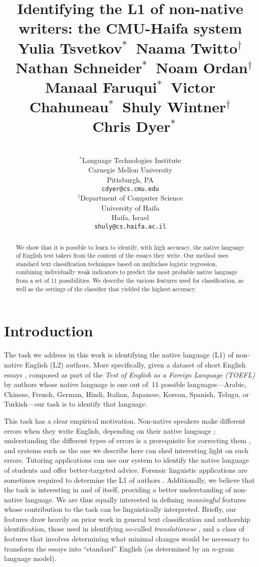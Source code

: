 \documentclass[11pt,letterpaper]{article}
\title{Identifying the L1 of non-native writers: the CMU-Haifa system\\[1em] 
{\large Yulia Tsvetkov$^\ast$\ Naama Twitto$^\dagger$\  Nathan Schneider$^\ast$\ Noam Ordan$^\dagger$\\ 
Manaal Faruqui$^\ast$\  Victor Chahuneau$^\ast$\  Shuly Wintner$^\dagger$ \  Chris Dyer$^\ast$}\\[-3em]
}
\author{
\\
$^\ast$Language Technologies Institute\\Carnegie Mellon University\\Pittsburgh, PA\\\texttt{cdyer@cs.cmu.edu}
\And
\\
$^\dagger$Department of Computer Science\\University of Haifa\\Haifa, Israel\\\texttt{shuly@cs.haifa.ac.il}
%
%
%
%
}
\date{}
\begin{document}
\maketitle
\begin{abstract}
We show that it is possible to learn to identify, with high accuracy, the native language of English test takers from the content of the essays they write.  Our method uses standard text classification
techniques based on multiclass logistic regression, combining individually weak indicators to predict the most probable native language from a set of 11 possibilities. We describe the various features
used for classification, as well as the settings of the classifier
that yielded the highest accuracy.
\end{abstract}

\section{Introduction}
\label{sec:intro}
The task we address in this work is identifying the native language
(L1) of non-native English (L2) authors. More specifically, given a
dataset of short English essays
\citep{blanchard-tetreault-higgins-cahill-chodorow:2013:TOEFL11-RR},
composed as part of the \emph{Test of English as a Foreign Language
  (TOEFL)} by authors whose native language is one out of~11 possible
languages---Arabic, Chinese, French, German, Hindi, Italian, Japanese,
Korean, Spanish, Telugu, or Turkish---our task is to identify that
language.

This task has a clear empirical motivation. Non-native speakers make
different errors when they write English, depending on their native
language \citep{lado-57,swan2001learner}; understanding the different types of
errors is a prerequisite for correcting them
\citep{Leacock:2010:AGE:1855062}, and systems such as the one we
describe here can shed interesting light on such errors. Tutoring
applications can use our system to identify the native language of
students and offer better-targeted advice. Forensic linguistic
applications are sometimes required to determine the L1 of authors
\citep{estival-gaustad-pham-radford-hutchinson:2007:ALTA2007,estival2007author}. Additionally,
we believe that the task is interesting in and of itself, providing a
better understanding of non-native language. We are thus equally
interested in defining \emph{meaningful} features whose contribution
to the task can be linguistically interpreted. Briefly, our features draw heavily on prior work in general text classification and authorship identification, those used in identifying so-called \emph{translationese} \cite{vered:noam:shuly}, and a class of features that involves  determining what minimal changes would be necessary to transform the essays into ``standard'' English (as determined by an $n$-gram language model).
\end{document}
